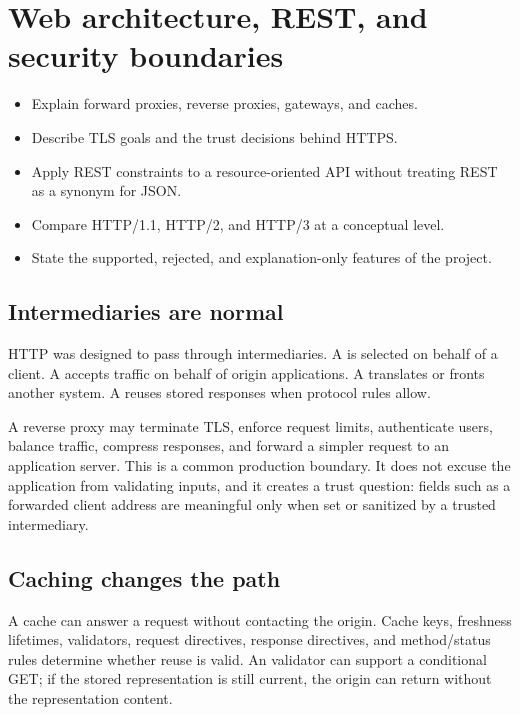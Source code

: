 \chapter{Web architecture, REST, and security boundaries}

\begin{objectives}
\begin{itemize}
  \item Explain forward proxies, reverse proxies, gateways, and caches.
  \item Describe TLS goals and the trust decisions behind HTTPS.
  \item Apply REST constraints to a resource-oriented API without treating REST as a synonym for JSON.
  \item Compare HTTP/1.1, HTTP/2, and HTTP/3 at a conceptual level.
  \item State the supported, rejected, and explanation-only features of the project.
\end{itemize}
\end{objectives}

\section{Intermediaries are normal}

HTTP was designed to pass through intermediaries. A  is
selected on behalf of a client. A  accepts traffic on behalf
of origin applications. A  translates or fronts another system.
A  reuses stored responses when protocol rules allow.

A reverse proxy may terminate TLS, enforce request limits, authenticate users,
balance traffic, compress responses, and forward a simpler request to an
application server. This is a common production boundary. It does not excuse
the application from validating inputs, and it creates a trust question: fields
such as a forwarded client address are meaningful only when set or sanitized by
a trusted intermediary.

\section{Caching changes the path}

A cache can answer a request without contacting the origin. Cache keys, freshness
lifetimes, validators, request directives, response directives, and method/status
rules determine whether reuse is valid. An  validator can support a
conditional GET; if the stored representation is still current, the origin can
return  without the representation content.

